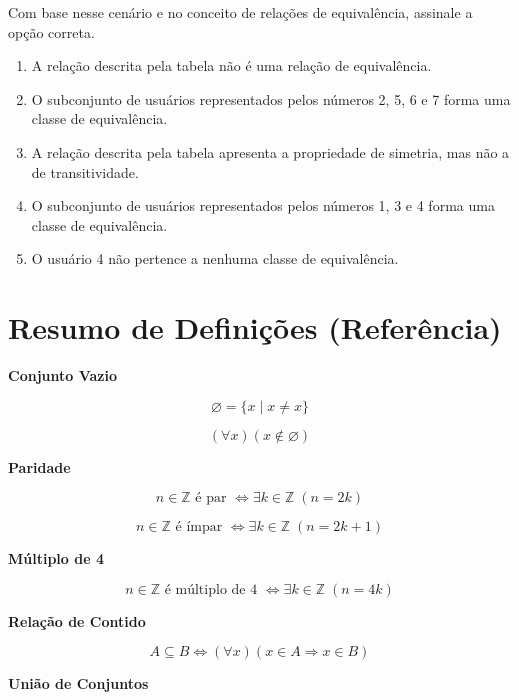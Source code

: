 \documentclass[12pt,a4paper]{article}
\begin{document}
Com base nesse cenário e no conceito de relações de equivalência, assinale a opção correta.
 
\begin{enumerate}[label=\Alph*)]
    \item A relação descrita pela tabela não é uma relação de equivalência.
    \item O subconjunto de usuários representados pelos números 2, 5, 6 e 7 forma uma classe de equivalência.
    \item A relação descrita pela tabela apresenta a propriedade de simetria, mas não a de transitividade.
    \item O subconjunto de usuários representados pelos números 1, 3 e 4 forma uma classe de equivalência.
    \item O usuário 4 não pertence a nenhuma classe de equivalência.
\end{enumerate}


\section*{Resumo de Definições (Referência)}

\textbf{Conjunto Vazio}

\[
\varnothing = \{x \mid x \neq x\}
\]

\[
(\forall x)(x \notin \varnothing)
\]

\textbf{Paridade}

\[
n \in \mathbb{Z} \text{ é par } \Leftrightarrow \exists k \in \mathbb{Z} \; (n = 2k)
\]

\[
n \in \mathbb{Z} \text{ é ímpar } \Leftrightarrow \exists k \in \mathbb{Z} \; (n = 2k + 1)
\]

\textbf{Múltiplo de 4}

\[
n \in \mathbb{Z} \text{ é múltiplo de 4 } \Leftrightarrow \exists k \in \mathbb{Z} \; (n = 4k)
\]

\vspace{0.3cm}

\textbf{Relação de Contido}

\[
A \subseteq B \Leftrightarrow (\forall x)(x \in A \Rightarrow x \in B)
\]

\vspace{0.3cm}

\textbf{União de Conjuntos}
\end{document}
